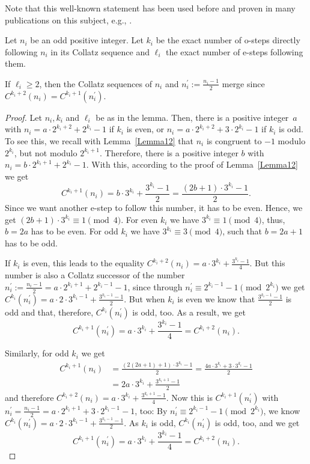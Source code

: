 \documentclass[12pt,reqno]{article}
\begin{document}
Note that this well-known statement has been used before and proven in many publications on this subject, e.g., \cite{RT}.
\begin{lemma}\label{Collatz-merger}
Let $n_i$ be an odd positive integer. Let $k_i$ be the exact number of o-steps directly following $n_i$ in its Collatz sequence and $\ell_i$ the exact number of e-steps following them.

If $\ell_i\geq 2$, then the Collatz sequences of $n_i$ and $n_i^{\prime}:=\tfrac{n_i-1}{2}$ merge since $C^{k_i+2}(n_i)=C^{k_i+1}(n_i^{\prime})$.
\end{lemma}

\begin{proof}
 Let $n_i, k_i$ and $\ell_i$ be as in the lemma. Then, there is a positive integer~$a$ with $n_i=a \cdot 2^{k_i+2}+2^{k_i}-1$ if $k_i$ is even, or $n_i=a \cdot 2^{k_i+2}+3\cdot 2^{k_i}-1$ if $k_i$ is odd. To see this, we recall with Lemma~\ref{Lemma12} that $n_i$ is congruent to $-1$ modulo $2^{k_i}$, but not modulo $2^{k_i+1}$. Therefore, there is a positive integer $b$ with $n_i=b \cdot 2^{k_i+1} + 2^{k_i}-1$. With this, according to the proof
of Lemma~\ref{Lemma12} we get 
\[C^{k_i+1}(n_i)=b \cdot 3^{k_i} + \frac{3^{k_i}-1}{2}=\frac{(2b+1) \cdot 3^{k_i}-1}{2}.\]
Since we want another e-step to follow this number, it has to be even. Hence, we get $(2b+1) \cdot 3^{k_i}\equiv 1\pmod{4}$. For even $k_i$ we have $3^{k_i}\equiv 1\pmod{4}$, thus, $b=2a$ has to be even. For odd $k_i$ we have $3^{k_i}\equiv 3\pmod{4}$, such that $b=2a+1$ has to be odd. 

If $k_i$ is even, this leads to the equality $C^{k_i+2}(n_i)=a\cdot 3^{k_i} + \tfrac{3^{k_i}-1}{4}$. But this number is also a Collatz successor of the number $n_i^{\prime}:=\tfrac{n_i-1}{2}=a\cdot 2^{k_i+1} + 2^{k_i-1}-1$, since through $n_i^{\prime} \equiv 2^{k_i-1}-1 \pmod{2^{k_i}}$ we get $C^{k_i}(n_i^{\prime}) = a \cdot 2 \cdot 3^{k_i-1} + \tfrac{3^{k_i-1}-1}{2}$. But when $k_i$ is even we know that $\tfrac{3^{k_i-1}-1}{2}$ is odd and that, therefore, $C^{k_i}(n_i^{\prime})$ is odd, too. As a result, we get 
\[C^{k_i+1}(n_i^{\prime})=a\cdot 3^{k_i}+\frac{3^{k_i}-1}{4}=C^{k_i+2}(n_i).\]

Similarly, for odd $k_i$ we get 
\begin{align*}
C^{k_i+1}(n_i)&=\frac{(2(2a+1)+1) \cdot 3^{k_i}-1}{2}=\frac{4a\cdot 3^{k_i} +3 \cdot 3^{k_i} -1}{2}\\
\quad&=2a\cdot 3^{k_i} + \frac{3^{k_i+1}-1}{2}
\end{align*}
and therefore $C^{k_i+2}(n_i)=a\cdot 3^{k_i} + \tfrac{3^{k_i+1}-1}{4}$. Now this is $C^{k_i+1}(n_i^{\prime})$ with $n_i^{\prime}=\tfrac{n_i-1}{2}=a \cdot 2^{k_i+1} + 3\cdot 2^{k_i-1}-1$, too: By $n_i^{\prime}\equiv 2^{k_i-1}-1\pmod{2^{k_i}}$, we know $C^{k_i}(n_i^{\prime})=a \cdot 2 \cdot 3^{k_i-1}+\tfrac{3^{k_i-1}-1}{2}$. As $k_i$ is odd, $C^{k_i}(n_i^{\prime})$ is odd, too, and we get 
\[C^{k_i+1}(n_i^{\prime})=a\cdot 3^{k_i}+\frac{3^{k_i}-1}{4}=C^{k_i+2}(n_i).\]
\end{proof}
\end{document}
